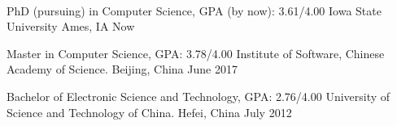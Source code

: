\\
\begin{cventries}

  \cventryTight
    {PhD (pursuing) in Computer Science, GPA (by now): 3.61/4.00} %
    {Iowa State University} %
    {Ames, IA} %
    {Now} %
    {}

  \cventryTight
    {Master in Computer Science, GPA: 3.78/4.00} %
    {Institute of Software, Chinese Academy of Science.} %
    {Beijing, China} %
    {June 2017} %
    {}

  \cventryTight
    {Bachelor of Electronic Science and Technology, GPA: 2.76/4.00}
    {University of Science and Technology of China.}
    {Hefei, China}
    {July 2012}
    {}
\end{cventries}
